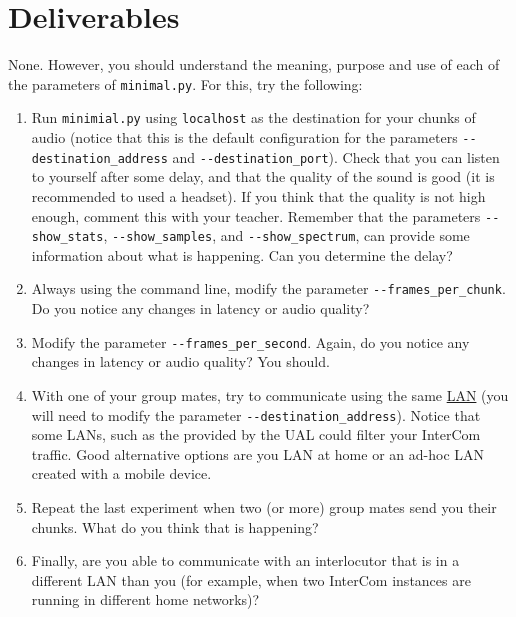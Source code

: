 \section{Deliverables}

None. However, you should understand the meaning, purpose and use of
each of the parameters of \texttt{minimal.py}. For this, try the
following:

\begin{enumerate}
\item Run \texttt{minimial.py} using \texttt{localhost} as the
  destination for your chunks of audio (notice that this is the
  default configuration for the parameters
  \verb|--destination_address| and \verb|--destination_port|). Check
  that you can listen to yourself after some delay, and that the
  quality of the sound is good (it is recommended to used a
  headset). If you think that the quality is not high enough, comment
  this with your teacher. Remember that the parameters
  \verb|--show_stats|, \verb|--show_samples|, and
  \verb|--show_spectrum|, can provide some information about what is
  happening. Can you determine the delay?
\item Always using the command line, modify the parameter
  \verb|--frames_per_chunk|. Do you notice any changes in latency
  or audio quality?
\item Modify the parameter \verb|--frames_per_second|. Again, do
  you notice any changes in latency or audio quality? You should.
\item With one of your group mates, try to communicate using the same
  \href{https://en.wikipedia.org/wiki/Local_area_network}{LAN} (you
  will need to modify the parameter
  \verb|--destination_address|). Notice that some LANs, such as the
  provided by the UAL could filter your InterCom traffic. Good
  alternative options are you LAN at home or an ad-hoc LAN created
  with a mobile device.
\item Repeat the last experiment when two (or more) group mates send
  you their chunks. What do you think that is happening?
\item Finally, are you able to communicate with an interlocutor that
  is in a different LAN than you (for example, when two InterCom
  instances are running in different home networks)?
\end{enumerate}

